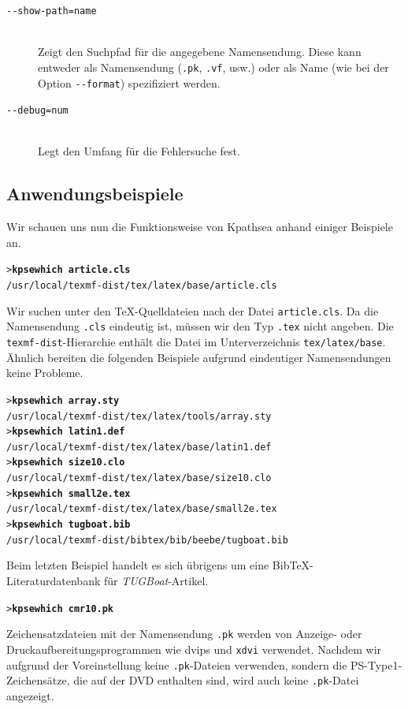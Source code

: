 \documentclass[12pt,ngerman,a4paper,fullparskip]{scrreprt}
\newcommand{\cmdname}[1]{\texttt{#1}}
\newcommand{\code}[1]{\texttt{#1}}
\newcommand{\file}[1]{\texttt{#1}}
\newcommand{\dirname}[1]{\texttt{#1}}
\newcommand{\KPS}{Kpathsea\xspace}
\newcommand{\var}[1]{\texttt{#1}}
\newcommand{\samp}[1]{\texttt{#1}}
\newcommand{\Ucom}[1]{\textbf{\texttt{#1}}}
\def\BibTeX{Bib\TeX}
\begin{document}
\begin{description}
\item[\texttt{-{}-show-path=}\var{name}]\mbox{}\\
     Zeigt den Suchpfad für die angegebene Namens\-endung. Diese kann entweder
     als Namens\-endung (\code{.pk}, \code{.vf}, usw.) oder als Name (wie bei der
     Option \code{-{}-format}) spezifiziert werden.
\item[\texttt{-{}-debug=}\var{num}]\mbox{}\\
     Legt den Umfang für die Fehlersuche fest.
\end{description}


\subsection{Anwendungsbeispiele}
\label{sec:examples-of-use}


Wir schauen uns nun die Funktionsweise von {\KPS} anhand einiger Beispiele an.

\begin{alltt}
> \Ucom{kpsewhich  article.cls}
   /usr/local/texmf-dist/tex/latex/base/article.cls
\end{alltt}

Wir suchen unter den \TeX-Quelldateien nach der Datei \file{article.cls}.
Da die Namens\-endung \samp{.cls} eindeutig ist, müssen wir den Typ
\samp{.tex} nicht angeben. Die \samp{texmf-dist}-Hierarchie enthält die
Datei im Unterverzeichnis \dirname{tex/latex/base}. Ähnlich bereiten
die folgenden Beispiele aufgrund eindeutiger Namens\-endungen keine Probleme.

\begin{alltt}
> \Ucom{kpsewhich array.sty}
   /usr/local/texmf-dist/tex/latex/tools/array.sty
> \Ucom{kpsewhich latin1.def}
   /usr/local/texmf-dist/tex/latex/base/latin1.def
> \Ucom{kpsewhich size10.clo}
   /usr/local/texmf-dist/tex/latex/base/size10.clo
> \Ucom{kpsewhich small2e.tex}
   /usr/local/texmf-dist/tex/latex/base/small2e.tex
> \Ucom{kpsewhich tugboat.bib}
   /usr/local/texmf-dist/bibtex/bib/beebe/tugboat.bib
\end{alltt}

Beim letzten Beispiel handelt es sich übrigens um eine \BibTeX-Literaturdatenbank für \textsl{TUGBoat}-Artikel.

\begin{alltt}
> \Ucom{kpsewhich cmr10.pk}
\end{alltt}

Zeichensatzdateien mit der Namens\-endung \samp{.pk} werden
von Anzeige- oder Druckaufbereitungsprogrammen wie dvips und
\cmdname{xdvi} verwendet. Nachdem wir aufgrund der Voreinstellung keine \file{.pk}-Dateien verwenden, sondern die PS-Type1-Zeichensätze, die auf der DVD enthalten sind, wird auch keine \file{.pk}-Datei angezeigt.
\end{document}
